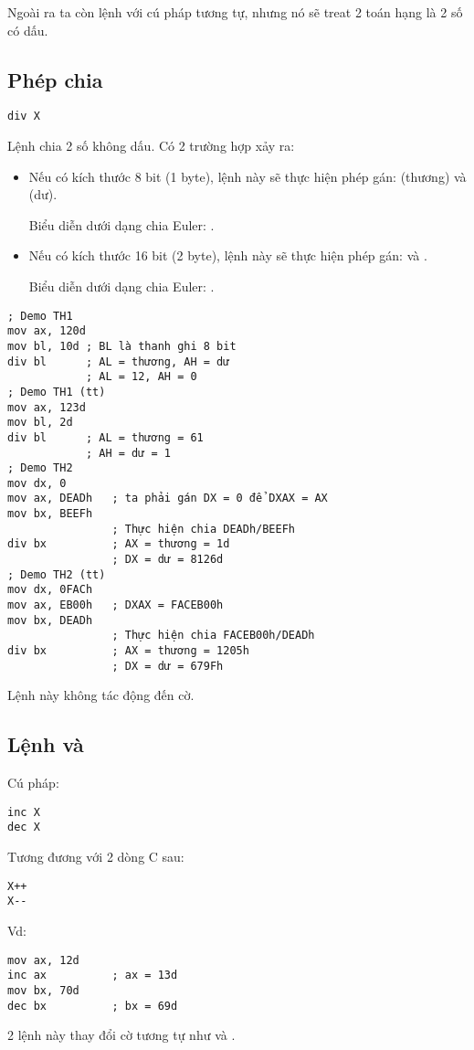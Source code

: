 \documentclass[main.tex]{subfiles}
\begin{document}
Ngoài ra ta còn lệnh  với cú pháp tương tự, nhưng nó sẽ treat 2 toán hạng là 2 số có dấu.

\subsection{Phép chia}
\begin{verbatim}
div X
\end{verbatim}
Lệnh  chia 2 số không dấu.
Có 2 trường hợp xảy ra:
\begin{itemize}
    \item Nếu  có kích thước 8 bit (1 byte), lệnh này sẽ thực hiện phép gán:  (thương) và  (dư).
    \par Biểu diễn dưới dạng chia Euler: .
    \item Nếu  có kích thước 16 bit (2 byte), lệnh này sẽ thực hiện phép gán:  và .
    \par Biểu diễn dưới dạng chia Euler: .
\end{itemize} 
\begin{verbatim}
; Demo TH1 
mov ax, 120d
mov bl, 10d ; BL là thanh ghi 8 bit 
div bl      ; AL = thương, AH = dư 
            ; AL = 12, AH = 0
; Demo TH1 (tt)
mov ax, 123d 
mov bl, 2d 
div bl      ; AL = thương = 61 
            ; AH = dư = 1
; Demo TH2 
mov dx, 0
mov ax, DEADh   ; ta phải gán DX = 0 để DXAX = AX 
mov bx, BEEFh 
                ; Thực hiện chia DEADh/BEEFh
div bx          ; AX = thương = 1d
                ; DX = dư = 8126d
; Demo TH2 (tt)
mov dx, 0FACh
mov ax, EB00h   ; DXAX = FACEB00h
mov bx, DEADh 
                ; Thực hiện chia FACEB00h/DEADh
div bx          ; AX = thương = 1205h
                ; DX = dư = 679Fh

\end{verbatim}
Lệnh này không tác động đến cờ.

\subsection{Lệnh  và }
Cú pháp:
\begin{verbatim}
inc X
dec X
\end{verbatim}
Tương đương với 2 dòng C sau:
\begin{verbatim}
X++
X--
\end{verbatim}
Vd:
\begin{verbatim}
mov ax, 12d 
inc ax          ; ax = 13d
mov bx, 70d     
dec bx          ; bx = 69d
\end{verbatim}
2 lệnh này thay đổi cờ tương tự như  và .
\end{document}
